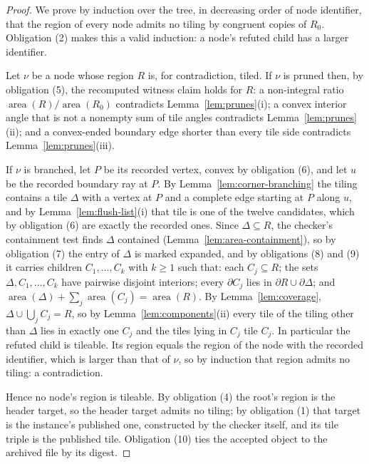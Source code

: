 \documentclass[11pt]{amsart}
\theoremstyle{definition}
\theoremstyle{remark}
\begin{document}
\begin{proof}
We prove by induction over the tree, in decreasing order of node identifier,
that the region of every node admits no tiling by congruent copies of $R_0$.
Obligation (2) makes this a valid induction: a node's refuted child has a
larger identifier.

Let $\nu$ be a node whose region $R$ is, for contradiction, tiled.  If $\nu$
is pruned then, by obligation (5), the recomputed witness claim holds for
$R$: a non-integral ratio $\operatorname{area}(R)/\operatorname{area}(R_0)$
contradicts Lemma~\ref{lem:prunes}(i); a convex interior angle that is not a
nonempty sum of tile angles contradicts Lemma~\ref{lem:prunes}(ii); and a
convex-ended boundary edge shorter than every tile side contradicts
Lemma~\ref{lem:prunes}(iii).

If $\nu$ is branched, let $P$ be its recorded vertex, convex by obligation
(6), and let $u$ be the recorded boundary ray at $P$.  By
Lemma~\ref{lem:corner-branching} the tiling contains a tile $\Delta$ with a
vertex at $P$ and a complete edge starting at $P$ along $u$, and by
Lemma~\ref{lem:flush-list}(i) that tile is one of the twelve candidates,
which by obligation (6) are exactly the recorded ones.  Since
$\Delta\subseteq R$, the checker's containment test finds $\Delta$ contained
(Lemma~\ref{lem:area-containment}), so by obligation (7) the entry of
$\Delta$ is marked expanded, and by obligations (8) and (9) it carries
children $C_1,\dots,C_k$ with $k\ge1$ such that: each $C_j\subseteq R$; the
sets $\Delta,C_1,\dots,C_k$ have pairwise disjoint interiors; every
$\partial C_j$ lies in $\partial R\cup\partial\Delta$; and
$\operatorname{area}(\Delta)+\sum_j\operatorname{area}(C_j)=
\operatorname{area}(R)$.  By Lemma~\ref{lem:coverage},
$\Delta\cup\bigcup_jC_j=R$, so by Lemma~\ref{lem:components}(ii) every tile
of the tiling other than $\Delta$ lies in exactly one $C_j$ and the tiles
lying in $C_j$ tile $C_j$.  In particular the refuted child is tileable.  Its
region equals the region of the node with the recorded identifier, which is
larger than that of $\nu$, so by induction that region admits no tiling: a
contradiction.

Hence no node's region is tileable.  By obligation (4) the root's region is
the header target, so the header target admits no tiling; by obligation (1)
that target is the instance's published one, constructed by the checker
itself, and its tile triple is the published tile.  Obligation (10) ties the
accepted object to the archived file by its digest.
\end{proof}
\end{document}
